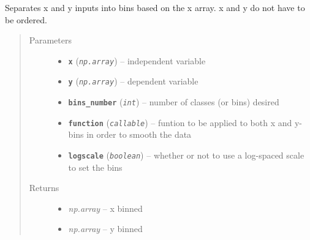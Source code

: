 \documentclass[a4paper,10pt,oneside]{sphinxmanual}
\begin{document}
\begin{fulllineitems}
\label{pymicra.algs:pymicra.algs.general.classbin}
Separates x and y inputs into bins based on the x array.
x and y do not have to be ordered.
\begin{quote}\begin{description}
\item[{Parameters}] \leavevmode\begin{itemize}
\item {} 
\textbf{\texttt{x}} (\emph{\texttt{np.array}}) -- independent variable

\item {} 
\textbf{\texttt{y}} (\emph{\texttt{np.array}}) -- dependent variable

\item {} 
\textbf{\texttt{bins\_number}} (\emph{\texttt{int}}) -- number of classes (or bins) desired

\item {} 
\textbf{\texttt{function}} (\emph{\texttt{callable}}) -- funtion to be applied to both x and y-bins in order to smooth the data

\item {} 
\textbf{\texttt{logscale}} (\emph{\texttt{boolean}}) -- whether or not to use a log-spaced scale to set the bins

\end{itemize}

\item[{Returns}] \leavevmode
\begin{itemize}
\item {} 
\emph{np.array} -- x binned

\item {} 
\emph{np.array} -- y binned

\end{itemize}


\end{description}\end{quote}

\end{fulllineitems}

\end{document}

